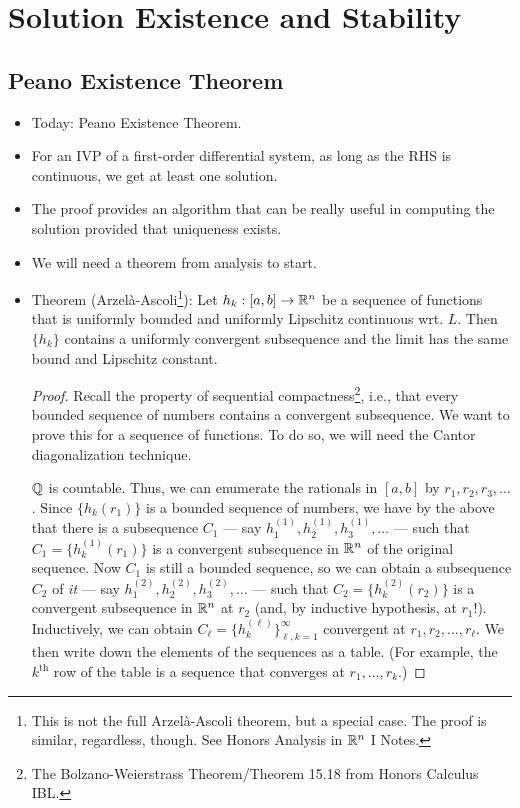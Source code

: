 \documentclass[../notes.tex]{subfiles}
\begin{document}
\chapter{Solution Existence and Stability}
\section{Peano Existence Theorem}
\begin{itemize}
    \item {}Today: Peano Existence Theorem.
    \item For an IVP of a first-order differential system, as long as the RHS is continuous, we get at least one solution.
    \item The proof provides an algorithm that can be really useful in computing the solution provided that uniqueness exists.
    \item We will need a theorem from analysis to start.
    \item Theorem (Arzel\`{a}-Ascoli\footnote{This is not the full Arzel\`{a}-Ascoli theorem, but a special case. The proof is similar, regardless, though. See Honors Analysis in $\mathbb{R}^n$ I Notes.}): Let $h_k:[a,b]\to\mathbb{R}^n$ be a sequence of functions that is uniformly bounded and uniformly Lipschitz continuous wrt. $L$. Then $\{h_k\}$ contains a uniformly convergent subsequence and the limit has the same bound and Lipschitz constant.
    \begin{proof}
        Recall the property of sequential compactness\footnote{The Bolzano-Weierstrass Theorem/Theorem 15.18 from Honors Calculus IBL.}, i.e., that every bounded sequence of numbers contains a convergent subsequence. We want to prove this for a sequence of functions. To do so, we will need the Cantor diagonalization technique.\par
        $\mathbb{Q}$ is countable. Thus, we can enumerate the rationals in $[a,b]$ by $r_1,r_2,r_3,\dots$. Since $\{h_k(r_1)\}$ is a bounded sequence of numbers, we have by the above that there is a subsequence $C_1$ --- say $h_1^{(1)},h_2^{(1)},h_3^{(1)},\dots$ --- such that $C_1=\{h_k^{(1)}(r_1)\}$ is a convergent subsequence in $\mathbb{R}^n$ of the original sequence. Now $C_1$ is still a bounded sequence, so we can obtain a subsequence $C_2$ of \emph{it} --- say $h_1^{(2)},h_2^{(2)},h_3^{(2)},\dots$ --- such that $C_2=\{h_k^{(2)}(r_2)\}$ is a convergent subsequence in $\mathbb{R}^n$ at $r_2$ (and, by inductive hypothesis, at $r_1$!). Inductively, we can obtain $C_\ell=\{h_k^{(\ell)}\}_{\ell,k=1}^\infty$ convergent at $r_1,r_2,\dots,r_\ell$. We then write down the elements of the sequences as a table. (For example, the $k^\text{th}$ row of the table is a sequence that converges at $r_1,\dots,r_k$.)

\end{proof}
\end{itemize}
\end{document}
